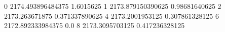0 2174.493896484375 1.6015625
1 2173.879150390625 0.98681640625
2 2173.263671875 0.371337890625
4 2173.2001953125 0.307861328125
6 2172.892333984375 0.0
8 2173.3095703125 0.417236328125
